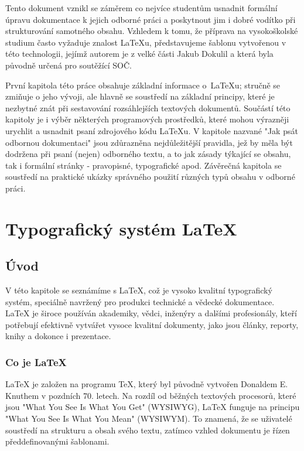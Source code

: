 \documentclass[12pt, a4paper,
twoside,        %
openright
]{report}
\begin{document}
Tento dokument vznikl se záměrem co nejvíce studentům usnadnit formální úpravu dokumentace k jejich odborné práci a poskytnout jim i dobré vodítko při strukturování samotného obsahu. Vzhledem k tomu, že příprava na vysokoškolské studium často vyžaduje znalost {\LaTeX}u, představujeme šablonu vytvořenou v této technologii, jejímž autorem je z velké části Jakub Dokulil a která byla původně určená pro soutěžící SOČ.  

První kapitola této práce obsahuje základní informace o~{\LaTeX}u; stručně se zmiňuje o jeho vývoji, ale hlavně se soustředí na základní principy, které je nezbytné znát při sestavování rozsáhlejších  textových dokumentů. Součástí této kapitoly je i výběr některých programových prostředků, které mohou výrazněji urychlit a usnadnit psaní zdrojového kódu {\LaTeX}u. V kapitole nazvané "Jak psát odbornou dokumentaci" jsou zdůrazněna nejdůležitější pravidla, jež by měla být dodržena při psaní (nejen) odborného textu, a to jak zásady týkající se obsahu, tak i formální stránky - pravopisné, typografické apod. Závěrečná kapitola se soustředí na praktické ukázky správného použití různých typů obsahu v odborné práci. 



\chapter{Typografický systém LaTeX}

\section{Úvod}
\label{sec:uvod}

V této kapitole se seznámíme s \LaTeX{}, což je vysoko kvalitní typografický systém, speciálně navržený pro produkci technické a vědecké dokumentace. \LaTeX{} je široce používán akademiky, vědci, inženýry a dalšími profesionály, kteří potřebují efektivně vytvářet vysoce kvalitní dokumenty, jako jsou články, reporty, knihy a dokonce i prezentace.

\subsection{Co je \LaTeX{}}
\LaTeX{} je založen na programu \TeX{}, který byl původně vytvořen Donaldem E. Knuthem v pozdních 70. letech. Na rozdíl od běžných textových procesorů, které jsou "What You See Is What You Get" (WYSIWYG), \LaTeX{} funguje na principu "What You See Is What You Mean" (WYSIWYM). To znamená, že se uživatelé soustředí na strukturu a obsah svého textu, zatímco vzhled dokumentu je řízen předdefinovanými šablonami.
\end{document}
